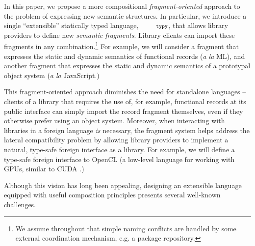 \documentclass[10pt]{sigplanconf}
\newcommand{\typy}{\texttt{\footnotesize typy}}
\begin{document}
In this paper, we propose a more compositional \emph{fragment-oriented} approach to the problem of expressing new semantic structures. In particular, we introduce a 
single ``extensible'' statically typed language, $\typy$, that allows library providers to define new \emph{semantic fragments}. Library clients can import these fragments in any combination.\footnote{We assume throughout that simple naming conflicts are handled by some external coordination mechanism, e.g. a package repository.} %
For example, we will consider a fragment that expresses the static and dynamic semantics of functional records (\emph{a la} ML), and another fragment that expresses the static and dynamic semantics of a prototypal object system (\emph{a la} JavaScript.)

This fragment-oriented approach diminishes the need for standalone languages -- clients of a library that requires the use of, for example, functional records at its public interface can simply import the record fragment themselves, even if they otherwise prefer using an object system. %
Moreover, when interacting with libraries in a foreign language \emph{is} necessary, the fragment system helps address the lateral compatibility problem by allowing library providers to implement a natural, type-safe foreign interface as a library. For example, we will define a type-safe foreign interface to OpenCL (a low-level language for working with GPUs, similar to CUDA \cite{klockner2011pycuda}.)

Although this vision has long been appealing, designing an {extensible language} equipped with useful composition principles presents several well-known challenges.

\end{document}

